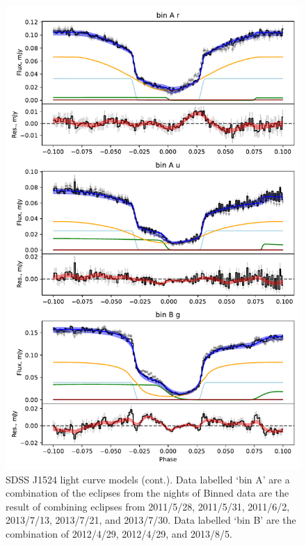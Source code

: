 \begin{figure}
    \centering
    \includegraphics[width=.95\textwidth, trim={0cm 0cm 0cm 0cm}, clip]{figures/results/SDSS1524/SDSS1524_3.pdf}
    \caption{SDSS J1524 light curve models (cont.). Data labelled `bin A' are a combination of the eclipses from the nights of Binned data are the result of combining eclipses from 2011/5/28, 2011/5/31, 2011/6/2, 2013/7/13, 2013/7/21, and 2013/7/30. Data labelled `bin B' are the combination of 2012/4/29, 2012/4/29, and 2013/8/5.}
    \label{fig:SDSS1524 all light curves cont 2}
\end{figure}
